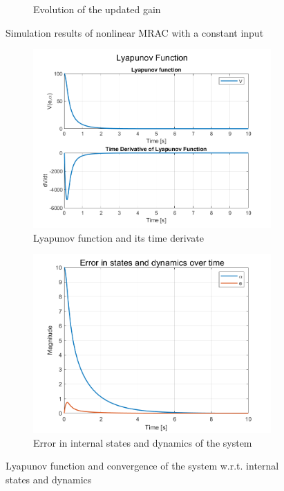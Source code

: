 \begin{figure}[!t]
\begin{subfigure}[b]{0.49\linewidth}
  \caption{Evolution of the updated gain}
  \label{fig:step-weights}
 \end{subfigure}
 \caption{Simulation results of nonlinear MRAC with a constant input}
 \label{fig:nl-step}
\end{figure}


\begin{figure}[!t]
 \centering
 \begin{subfigure}[b]{0.49\linewidth}
  \centering
  \includegraphics[width=\linewidth]{images/NL-MRAC-SIM/Step/v2/NMRAC_First-Order_Lyapunov.png}
  \caption{Lyapunov function and its time derivate}
  \label{fig:Lyapunov-step-input}
 \end{subfigure}
 \hfill
 \begin{subfigure}[b]{0.49\linewidth}
  \centering
  \includegraphics[width=\linewidth]{images/NL-MRAC-SIM/Step/v2/NMRAC_First-Order_Alpha.png}
  \caption{Error in internal states and dynamics of the system}
  \label{fig:step-error}
 \end{subfigure}
 \caption{Lyapunov function and convergence of the system w.r.t. internal states and dynamics}
 \label{fig:step-lyap}
\end{figure}

